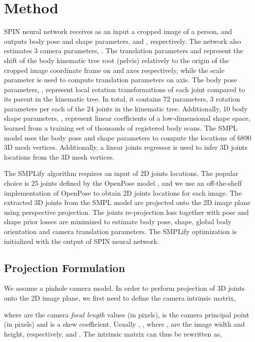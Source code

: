 \documentclass[runningheads]{llncs}
\begin{document}
\section{Method}

SPIN neural network receives as an input a cropped image  of a person, and outputs body pose and shape parameters,  and , respectively.
The network also estimates 3 camera parameters, . The translation parameters  and   represent the shift of the body kinematic tree root (pelvis) relatively to the origin of the cropped image coordinate frame on  and  axes respectively, while the scale parameter  is used to compute translation parameters   on  axis. 
The body pose parameters, , represent local rotation transformations of each joint compared to its parent in the kinematic tree. In total, it contains 72 parameters, 3 rotation parameters per each of the 24 joints in the kinematic tree. Additionally, 10 body shape parameters, , represent linear coefficients of a low-dimensional shape space, learned from a training set of thousands of registered body scans. The SMPL model uses the body pose and shape parameters to compute the locations of 6890 3D mesh vertices. Additionally, a linear joints regressor is used to infer 3D joints locations from the 3D mesh vertices.

The SMPLify algorithm requires an input of 2D joints locations. The popular choice is 25 joints defined by the OpenPose model \cite{cao2017realtime}, and we use an off-the-shelf implementation of OpenPose to obtain 2D joints locations for each image. 
The extracted 3D joints from the SMPL model are projected onto the 2D image plane using perspective projection. The joints re-projection loss together with pose and shape prior losses are minimized to estimate body pose, shape, global body orientation and camera translation parameters. The SMPLify optimization is initialized with the output of SPIN neural network.

\subsection{Projection Formulation}
\label{sec:projection_formulation}

We assume a pinhole camera model. In order to perform projection of 3D joints onto the 2D image plane, we first need to define the camera intrinsic matrix,

where  are the camera \emph{focal length} values (in pixels),  is the camera principal point (in pixels) and  is a skew coefficient. Usually , , where ,  are the image width and height, respectively, and . The intrinsic matrix can thus be rewritten as,
\end{document}
